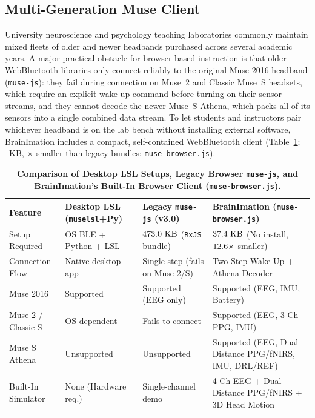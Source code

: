 \documentclass[11pt]{article}
\begin{document}
\subsection{Multi-Generation Muse Client}
University neuroscience and psychology teaching laboratories commonly maintain mixed fleets of older and newer headbands purchased across several academic years. A major practical obstacle for browser-based instruction is that older WebBluetooth libraries only connect reliably to the original Muse 2016 headband (\texttt{muse-js}): they fail during connection on Muse~2 and Classic Muse~S headsets, which require an explicit wake-up command before turning on their sensor streams, and they cannot decode the newer Muse~S Athena, which packs all of its sensors into a single combined data stream. To let students and instructors pair whichever headband is on the lab bench without installing external software, BrainImation includes a compact, self-contained WebBluetooth client (Table~\ref{tab:gatt}; \MuseBrowserKB~KB, \BundleReductionFactor$\times$ smaller than legacy bundles; \texttt{muse-browser.js}).

\begin{table}[t!]
\centering
\caption{\textbf{Comparison of Desktop LSL Setups, Legacy Browser \texttt{muse-js}, and BrainImation's Built-In Browser Client (\texttt{muse-browser.js}).}}
\label{tab:gatt}
\footnotesize
\setlength{\tabcolsep}{5pt}
\begin{tabular}{p{}p{}p{}p{}}
\toprule
\textbf{Feature} & \textbf{Desktop LSL (\texttt{muselsl}+Py)} & \textbf{Legacy \texttt{muse-js} (v3.0)} & \textbf{BrainImation (\texttt{muse-browser.js})} \\
\midrule
Setup Required & OS BLE + Python + LSL & $473.0\text{ KB}$ (\texttt{RxJS} bundle) & $37.4\text{ KB}$ (No install, $12.6\times$ smaller) \\
Connection Flow & Native desktop app & Single-step (fails on Muse 2/S) & Two-Step Wake-Up + Athena Decoder \\
Muse 2016 & Supported & Supported (EEG only) & Supported (EEG, IMU, Battery) \\
Muse 2 / Classic S & OS-dependent & Fails to connect & Supported (EEG, 3-Ch PPG, IMU) \\
Muse S Athena & Unsupported & Unsupported & Supported (EEG, Dual-Distance PPG/fNIRS, IMU, DRL/REF) \\
Built-In Simulator & None (Hardware req.) & Single-channel demo & 4-Ch EEG + Dual-Distance PPG/fNIRS + 3D Head Motion \\
\bottomrule
\end{tabular}
\end{table}
\end{document}
